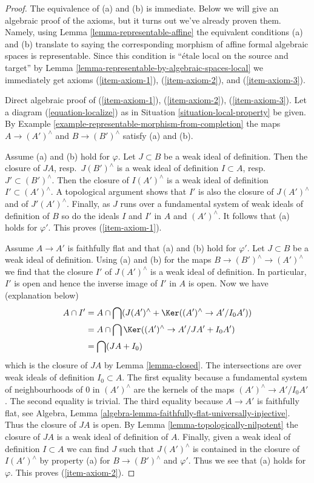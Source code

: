 \begin{proof}
The equivalence of (a) and (b) is immediate. Below we will give an
algebraic proof of the axioms, but it turns out we've already proven
them. Namely, using Lemma \ref{lemma-representable-affine}
the equivalent conditions (a) and (b) translate to saying the
corresponding morphism of affine formal algebraic spaces is representable.
Since this condition is ``\'etale local on the source and target'' by
Lemma \ref{lemma-representable-by-algebraic-spaces-local}
we immediately get axioms (\ref{item-axiom-1}), (\ref{item-axiom-2}), and
(\ref{item-axiom-3}).

\medskip\noindent
Direct algebraic proof of (\ref{item-axiom-1}), (\ref{item-axiom-2}),
(\ref{item-axiom-3}). Let a diagram (\ref{equation-localize}) as in
Situation \ref{situation-local-property} be given.
By Example \ref{example-representable-morphism-from-completion}
the maps $A \to (A')^\wedge$ and $B \to (B')^\wedge$
satisfy (a) and (b).

\medskip\noindent
Assume (a) and (b) hold for $\varphi$. Let $J \subset B$ be a weak ideal
of definition. Then the closure of $JA$, resp.\ $J(B')^\wedge$
is a weak ideal of definition $I \subset A$, resp.\ $J' \subset (B')^\wedge$.
Then the closure of $I(A')^\wedge$ is a weak ideal of definition
$I' \subset (A')^\wedge$. A topological argument shows that $I'$ is also
the closure of $J(A')^\wedge$ and of $J'(A')^\wedge$.
Finally, as $J$ runs over a fundamental system of weak ideals of definition
of $B$ so do the ideals $I$ and $I'$ in $A$ and $(A')^\wedge$.
It follows that (a) holds for $\varphi'$. This proves (\ref{item-axiom-1}).

\medskip\noindent
Assume $A \to A'$ is faithfully flat and that (a) and (b) hold for $\varphi'$.
Let $J \subset B$ be a weak ideal of definition. Using (a) and (b)
for the maps $B \to (B')^\wedge \to (A')^\wedge$ we find that the
closure $I'$ of $J(A')^\wedge$ is a weak ideal of definition.
In particular, $I'$ is open and hence the inverse image of $I'$
in $A$ is open. Now we have (explanation below)
\begin{align*}
A \cap I'
& =
A \cap \bigcap (J(A')^\wedge + \Ker((A')^\wedge \to A'/I_0A')) \\
& =
A \cap \bigcap \Ker((A')^\wedge \to A'/JA' + I_0 A') \\
& = \bigcap (JA + I_0)
\end{align*}
which is the closure of $JA$ by Lemma \ref{lemma-closed}.
The intersections are over weak ideals of definition $I_0 \subset A$.
The first equality because a fundamental system of neighbourhoods of
$0$ in $(A')^\wedge$ are the kernels of the maps $(A')^\wedge \to A'/I_0A'$.
The second equality is trivial. The third equality because $A \to A'$
is faithfully flat, see
Algebra, Lemma \ref{algebra-lemma-faithfully-flat-universally-injective}.
Thus the closure of $JA$ is open. By Lemma \ref{lemma-topologically-nilpotent}
the closure of $JA$
is a weak ideal of definition of $A$. Finally, given a weak
ideal of definition $I \subset A$ we can find $J$ such that
$J(A')^\wedge$ is contained in the closure of $I(A')^\wedge$
by property (a) for $B \to (B')^\wedge$ and $\varphi'$.
Thus we see that (a) holds for $\varphi$. This proves (\ref{item-axiom-2}).


\end{proof}
